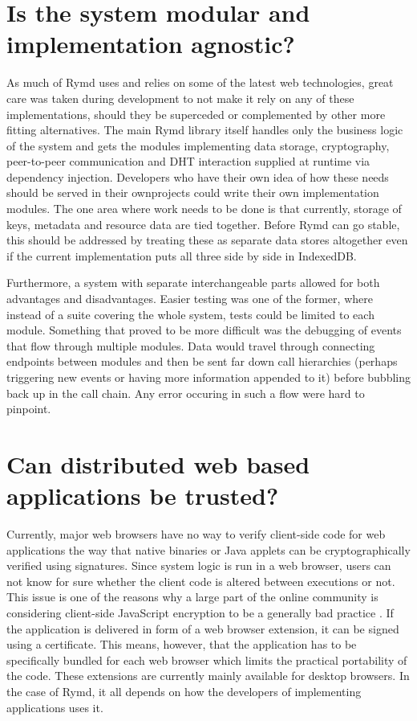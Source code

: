 \section{Is the system modular and implementation agnostic?}
As much of Rymd uses and relies on some of the latest web technologies, great care was taken during development to not make it rely on any of these implementations, should they be superceded or complemented by other more fitting alternatives. The main Rymd library itself handles only the business logic of the system and gets the modules implementing data storage, cryptography, peer-to-peer communication and DHT interaction supplied at runtime via dependency injection. Developers who have their own idea of how these needs should be served in their ownprojects could write their own implementation modules. The one area where work needs to be done is that currently, storage of keys, metadata and resource data are tied together. Before Rymd can go stable, this should be addressed by treating these as separate data stores altogether even if the current implementation puts all three side by side in IndexedDB.

Furthermore, a system with separate interchangeable parts allowed for both advantages and disadvantages. Easier testing was one of the former, where instead of a suite covering the whole system, tests could be limited to each module. Something that proved to be more difficult was the debugging of events that flow through multiple modules. Data would travel through connecting endpoints between modules and then be sent far down call hierarchies (perhaps triggering new events or having more information appended to it) before bubbling back up in the call chain. Any error occuring in such a flow were hard to pinpoint.

\section{Can distributed web based applications be trusted?}
Currently, major web browsers have no way to verify client-side code for web applications the way that native binaries or Java applets can be cryptographically verified using signatures. Since system logic is run in a web browser, users can not know for sure whether the client code is altered between executions or not. This issue is one of the reasons why a large part of the online community is considering client-side JavaScript encryption to be a generally bad practice \cite{Matasano:Online}. If the application is delivered in form of a web browser extension, it can be signed using a certificate. This means, however, that the application has to be specifically bundled for each web browser which limits the practical portability of the code. These extensions are currently mainly available for desktop browsers. In the case of Rymd, it all depends on how the developers of implementing applications uses it.

